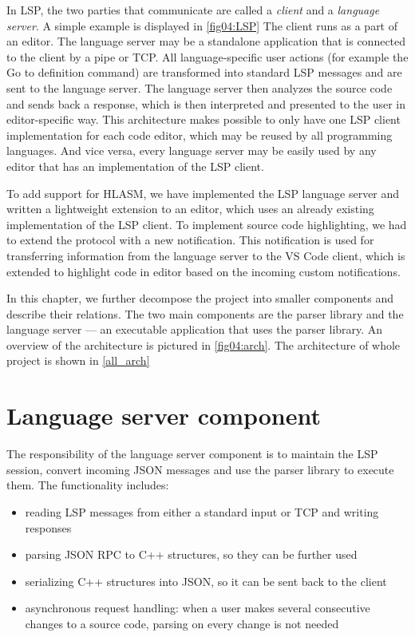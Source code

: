 In LSP, the two parties that communicate are called a \emph{client} and a \emph{language server}. A simple example is displayed in \cref{fig04:LSP} The client runs as a part of an editor. The language server may be a standalone application that is connected to the client by a pipe or TCP. All language-specific user actions (for example the Go to definition command) are transformed into standard LSP messages and are sent to the language server. The language server then analyzes the source code and sends back a response, which is then interpreted and presented to the user in editor-specific way. This architecture makes possible to only have one LSP client implementation for each code editor, which may be reused by all programming languages. And vice versa, every language server may be easily used by any editor that has an implementation of the LSP client.

To add support for HLASM, we have implemented the LSP language server and written a lightweight extension to an editor, which uses an already existing implementation of the LSP client. To implement source code highlighting, we had to extend the protocol with a new notification. This notification is used for transferring information from the language server to the VS Code client, which is extended to highlight code in editor based on the incoming custom notifications.

In this chapter, we further decompose the project into smaller components and describe their relations. The two main components are the parser library and the language server --- an executable application that uses the parser library. An overview of the architecture is pictured in \cref{fig04:arch}. The architecture of whole project is shown in \cref{all_arch}

\section{Language server component}

The responsibility of the language server component is to maintain the LSP session, convert incoming JSON messages and use the parser library to execute them. The functionality includes:
\begin{itemize}
    \item reading LSP messages from either a standard input or TCP and writing responses
    \item parsing JSON RPC to C++ structures, so they can be further used
    \item serializing C++ structures into JSON, so it can be sent back to the client
    \item asynchronous request handling: when a user makes several consecutive changes to a source code, parsing on every change is not needed
\end{itemize}

